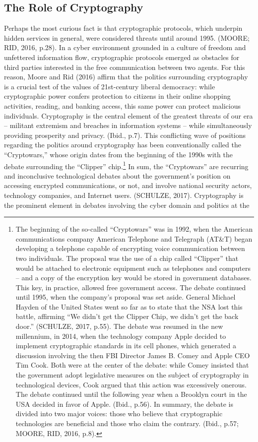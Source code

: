 \subsection{The Role of Cryptography}

Perhaps the most curious fact is that cryptographic protocols, which underpin hidden services in general, were considered threats until around 1995. (MOORE; RID, 2016, p.28). In a cyber environment grounded in a culture of freedom and unfettered information flow, cryptographic protocols emerged as obstacles for third parties interested in the free communication between two agents. For this reason, Moore and Rid (2016) affirm that the politics surrounding cryptography is a crucial test of the values of 21st-century liberal democracy: while cryptographic power confers protection to citizens in their online shopping activities, reading, and banking access, this same power can protect malicious individuals. Cryptography is the central element of the greatest threats of our era -- militant extremism and breaches in information systems -- while simultaneously providing prosperity and privacy. (Ibid., p.7). This conflicting wave of positions regarding the politics around cryptography has been conventionally called the ``Cryptowars,'' whose origin dates from the beginning of the 1990s with the debate surrounding the ``Clipper'' chip.\footnote{The beginning of the so-called ``Cryptowars'' was in 1992, when the American communications company American Telephone and Telegraph (AT\&T) began developing a telephone capable of encrypting voice communication between two individuals. The proposal was the use of a chip called ``Clipper'' that would be attached to electronic equipment such as telephones and computers -- and a copy of the encryption key would be stored in government databases. This key, in practice, allowed free government access. The debate continued until 1995, when the company's proposal was set aside. General Michael Hayden of the United States went so far as to state that the NSA lost this battle, affirming ``We didn't get the Clipper Chip, we didn't get the back door.'' (SCHULZE, 2017, p.55). The debate was resumed in the new millennium, in 2014, when the technology company Apple decided to implement cryptographic standards in its cell phones, which generated a discussion involving the then FBI Director James B. Comey and Apple CEO Tim Cook. Both were at the center of the debate: while Comey insisted that the government adopt legislative measures on the subject of cryptography in technological devices, Cook argued that this action was excessively onerous. The debate continued until the following year when a Brooklyn court in the USA decided in favor of Apple. (Ibid., p.56). In summary, the debate is divided into two major voices: those who believe that cryptographic technologies are beneficial and those who claim the contrary. (Ibid., p.57; MOORE, RID, 2016, p.8).} In sum, the ``Cryptowars'' are recurring and inconclusive technological debates about the government's position on accessing encrypted communications, or not, and involve national security actors, technology companies, and Internet users. (SCHULZE, 2017). Cryptography is the prominent element in debates involving the cyber domain and politics at the 